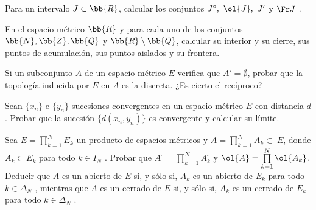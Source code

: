 \begin{ejercicio}
    Para un intervalo $J \subset \bb{R}$, calcular los conjuntos $J^\circ,~\ol{J},~J'$ y $\Fr J$ .
\end{ejercicio}

\begin{ejercicio}
    En el espacio métrico $\bb{R}$ y para cada uno de los conjuntos $\bb{N}, \bb{Z}, \bb{Q}$ y $\bb{R}\setminus \bb{Q}$, calcular su interior y su cierre, sus puntos de acumulación, sus puntos aislados y su frontera.
\end{ejercicio}

\begin{ejercicio}
    Si un subconjunto $A$ de un espacio métrico $E$ verifica que $A'=\emptyset$, probar que la topología inducida por $E$ en $A$ es la discreta. ¿Es cierto el recíproco?
\end{ejercicio}

\begin{ejercicio}
    Sean $\{x_n\}$ e $\{y_n\}$ sucesiones convergentes en un espacio métrico $E$ con distancia $d$. Probar que la sucesión $\{d(x_n, y_n)\}$ es convergente y calcular su límite.
\end{ejercicio}


\begin{ejercicio}
    Sea $E = \prod\limits_{k=1}^N E_k$ un producto de espacios métricos y $A =\prod\limits_{k=1}^N A_k\subset~E$, donde $A_k \subset E_k$ para todo $k \in I_N$ . Probar que $A^\circ =\prod\limits_{k=1}^N A_k^\circ$ y $\ol{A} =\prod\limits_{k=1}^N \ol{A_k}$. Deducir que $A$ es un abierto de $E$ si, y sólo si, $A_k$ es un abierto de $E_k$ para todo $k \in \Delta_N$ , mientras que $A$ es un cerrado de $E$ si, y sólo si, $A_k$ es un cerrado de $E_k$ para todo $k \in \Delta_N$ .
\end{ejercicio}